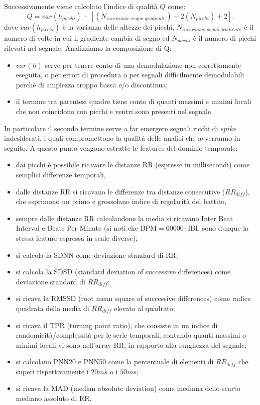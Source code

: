 \documentclass[a4paper, 12pt]{book}
\begin{document}
Successivamente viene calcolato l'indice di qualità $Q$ come:
\begin{equation}
	Q = var(h_{picchi})\;\cdot\;[(N_{inversione\;segno\;gradiente}) - 2(N_{picchi}) +2].
\end{equation}
dove $var(h_{picchi})$ è la varianza delle altezze dei picchi, $N_{inversione\;segno\;gradiente}$ è il numero di volte in cui il gradiente cambia di segno ed $N_{picchi}$ è il numero di picchi rilevati nel segnale.
Analizziamo la composizione di Q:\begin{itemize}
	\item $var(h)$ serve per tenere conto di una demodulazione non correttamente 					  eseguita, o per errori di procedura o per segnali difficilmente demodulabili 				  perchè di ampiezza troppo bassa e/o discontinua;
	\item il termine tra parentesi quadre tiene conto di quanti massimi e minimi locali 		  che non coincidono con picchi e ventri sono presenti nel segnale.
\end{itemize}
In particolare il secondo termine serve a far emergere segnali ricchi di $spike$ indesiderati, i quali compromettono la qualità delle analisi che avverranno in seguito.
A questo punto vengono estratte le features del dominio temporale:\begin{itemize}
	\item dai picchi è possibile ricavare le distanze RR (espresse in millisecondi) 				  come semplici differenze temporali,
	\item dalle distanze RR si ricavano le differenze tra distanze consecutive 						  ($RR_{diff}$), che esprimono un primo e grossolano indice di regolarità del 				  battito,
	\item sempre dalle distanze RR calcolandone la media si ricavano Inter Beat 					  Interval e Beats Per Minute (si noti che BPM$ = 60000\cdot $IBI, sono dunque 				  la stessa feature espressa in scale diverse);
	\item si calcola la SDNN come deviazione standard di RR;
	\item si calcola la SDSD (standard deviation of successive differences) come 					  deviazione standard di $RR_{diff}$;
	\item si ricava la RMSSD (root mean square of successive differences) come 					  radice quadrata della media di $RR_{diff}$ elevato al quadrato;
	\item si ricava il TPR (turning point ratio), che consiste in un indice di 					  randomicità/complessità per le serie temporali, contando quanti massimi o 				  minimi locali vi sono nell'array RR, in rapporto alla lunghezza del segnale;
	\item si calcolano PNN20 e PNN50 come la percentuale di elementi di 				  	  	  $RR_{diff}$ che superi rispettivamente i $20ms$ o i $50ms$;
	\item si ricava la MAD (median absolute deviation) come mediana dello scarto 					  mediano assoluto di RR.
\end{itemize}
\end{document}
